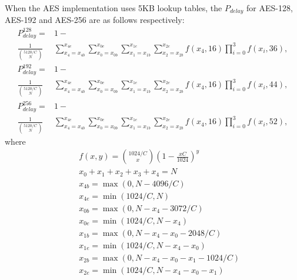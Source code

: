When the AES implementation uses 5KB lookup tables, the $P_{delay}$ for AES-128, AES-192 and AES-256 are as follows respectively:
\begin{align}
    P_{delay}^{128} = &1-   \nonumber \\
    \frac{1}{\binom{5120/C}{N}}&\sum_{x_4=x_{4b}}^{x_{4e}}{\sum_{x_0=x_{0b}}^{x_{0e}}{\sum_{x_1=x_{1b}}^{x_{1e}}{ \sum_{x_2=x_{2b}}^{x_{2e}}{f(x_4,16)\prod_{i=0}^{3}{f(x_i,36)}}}}}, \nonumber
\end{align}
\begin{align}
    P_{delay}^{192} = &1-  \nonumber \\
    \frac{1}{\binom{5120/C}{N}}&\sum_{x_4=x_{4b}}^{x_{4e}}{\sum_{x_0=x_{0b}}^{x_{0e}}{\sum_{x_1=x_{1b}}^{x_{1e}}{ \sum_{x_2=x_{2b}}^{x_{2e}}{f(x_4,16)\prod_{i=0}^{3}{f(x_i,44)}}}}}, \nonumber
\end{align}
\begin{align}
    P_{delay}^{256} = &1-  \nonumber \\
    \frac{1}{\binom{5120/C}{N}}&\sum_{x_4=x_{4b}}^{x_{4e}}{\sum_{x_0=x_{0b}}^{x_{0e}}{\sum_{x_1=x_{1b}}^{x_{1e}}{ \sum_{x_2=x_{2b}}^{x_{2e}}{f(x_4,16)\prod_{i=0}^{3}{f(x_i,52)}}}}}, \nonumber
\end{align}
where
  \begin{eqnarray*}
    &&f(x,y) = \binom{1024/C}{x}(1-\frac{xC}{1024})^{y} \\
    &&x_0+x_1+x_2+x_3+x_4 = N \\
    &&x_{4b} = \max(0,N-4096/C) \\
    &&x_{4e} = \min(1024/C,N) \\
    &&x_{0b} = \max(0,N-x_4-3072/C) \\
    &&x_{0e} = \min(1024/C,N-x_4) \\
    &&x_{1b} = \max(0,N-x_4-x_0-2048/C) \\
    &&x_{1e} = \min(1024/C,N-x_4-x_0) \\
    &&x_{2b} = \max(0,N-x_4-x_0-x_1-1024/C) \\
    &&x_{2e} = \min(1024/C,N-x_4-x_0-x_1)
  \end{eqnarray*}

